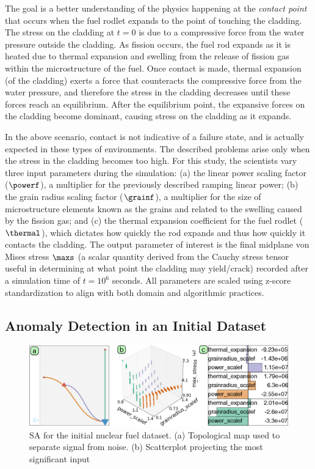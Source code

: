 The goal is a better understanding of the physics happening at the \emph{contact point} that occurs when the fuel rodlet expands to the point of touching the cladding.
%
The stress on the cladding at $t=0$ is due to a compressive force from the water pressure outside the cladding.
%
As fission occurs, the fuel rod expands as it is heated due to thermal expansion and swelling from the release of fission gas within the microstructure of the fuel.
%
Once contact is made, thermal expansion (of the cladding) exerts a force that counteracts the compressive force from the water pressure, and therefore the stress in the cladding decreases until these forces reach an equilibrium.
%
After the equilibrium point, the expansive forces on the cladding become dominant, causing stress on the cladding as it expands.

In the above scenario, contact is not indicative of a failure state, and is actually expected in these types of environments.
%
The described problems arise only when the stress in the cladding becomes too high.
%
For this study, the scientists vary three input parameters during the simulation: (a) the linear power scaling factor ($\powerf$), a multiplier for the previously described ramping linear power; (b) the grain radius scaling factor ($\grainf$), a multiplier for the size of microstructure elements known as the grains and related to the swelling caused by the fission gas; and (c) the thermal expansion coefficient for the fuel rodlet ($\thermal$), which dictates how quickly the rod expands and thus how quickly it contacts the cladding.
%
The output parameter of interest is the final midplane von Mises stress $\maxs$ (a scalar quantity derived from the Cauchy stress tensor useful in determining at what point the cladding may yield/crack) recorded after a simulation time of $t=10^6$ seconds.
%
All parameters are scaled using z-score standardization to align with both domain and algorithmic practices.

\subsection{Anomaly Detection in an Initial Dataset}
\label{sec:anomaly}

\begin{figure}[htbp]
  \centering
  \includegraphics[width=1.0\linewidth]{figs/chap6/bisonError2}
  \caption{SA for the initial nuclear fuel dataset.
  (a) Topological map used to separate signal from noise.
  (b) Scatterplot projecting the most significant input }
  \label{fig:bisonError}
\end{figure}

